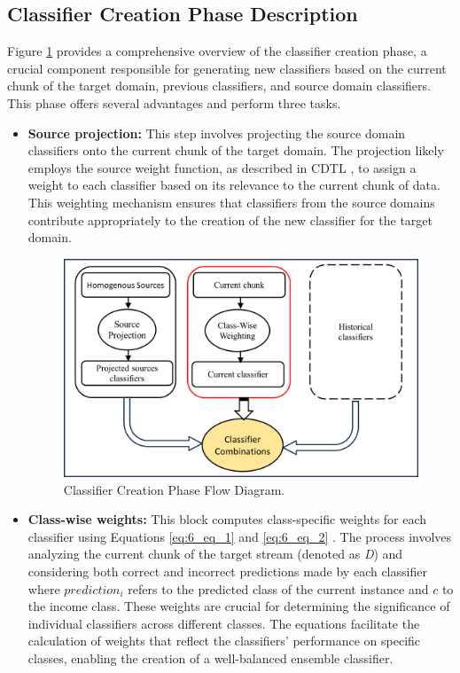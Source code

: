 \subsection{Classifier Creation Phase Description} 
Figure \ref{fig:6_alg_2} provides a comprehensive overview of the classifier creation phase, a crucial component responsible for generating new classifiers based on the current chunk of the target domain, previous classifiers, and source domain classifiers. This phase offers several advantages and perform three tasks.
\begin{itemize}
	\setlength{\itemsep}{0pt}
    \setlength{\parskip}{0pt}
	\item \textbf{Source projection:} This step involves projecting the source domain classifiers onto the current chunk of the target domain. The projection likely employs the source weight function, as described in CDTL \cite{yang2021concept}, to assign a weight to each classifier based on its relevance to the current chunk of data. This weighting mechanism ensures that classifiers from the source domains contribute appropriately to the creation of the new classifier for the target domain.
	\begin{figure}[H]
		\centering
		\includegraphics[width=0.8\linewidth]{6_transfer_learning/figures/alg2.png}
	  \caption{Classifier Creation Phase Flow Diagram.}
		\label{fig:6_alg_2}
	\end{figure}
	\item \textbf{Class-wise weights:} This block computes class-specific weights for each classifier using Equations \ref{eq:6_eq_1} and \ref{eq:6_eq_2} . The process involves analyzing the current chunk of the target stream (denoted as \emph{D}) and considering both correct and incorrect predictions made by each classifier where $prediction_i$ refers to the predicted class of the current instance and $c$ to the income class. These weights are crucial for determining the significance of individual classifiers across different classes. The equations facilitate the calculation of weights that reflect the classifiers' performance on specific classes, enabling the creation of a well-balanced ensemble classifier.

\end{itemize}
